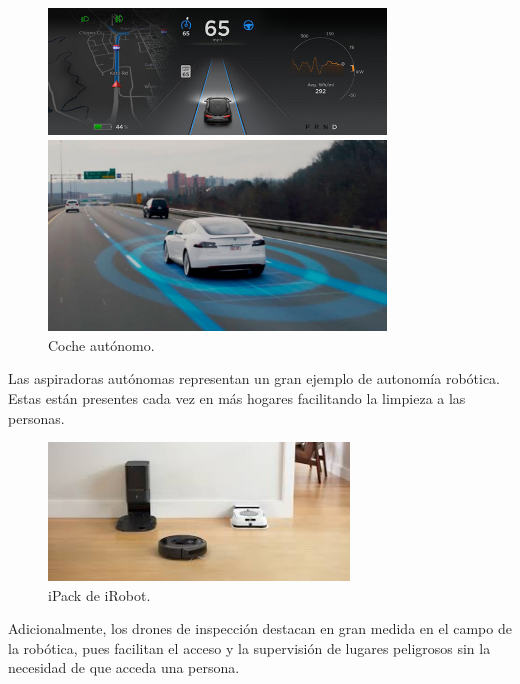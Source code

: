 \documentclass[a4paper, 12pt]{book}
\begin{document}
\begin{figure}[H]
  \centering
  \begin{minipage}[b]{\textwidth}
  	\centering
    \includegraphics[width=0.8\textwidth]{img/coche}
  \end{minipage}
  \hfill
  \begin{minipage}[b]{\textwidth}
    \centering
    \includegraphics[width=0.8\textwidth]{img/tesla.jpg}
  \end{minipage}
  \caption{Coche autónomo.}
\end{figure}

Las aspiradoras autónomas representan un gran ejemplo de autonomía robótica. Estas están presentes cada vez en más hogares facilitando la limpieza a las personas.

\begin{figure}[H]
	\centering
    \includegraphics[width=8cm, keepaspectratio]{img/ipack.jpeg}
    \caption{iPack de iRobot.}
    \label{figura:aspiradora_autonoma}
\end{figure}

Adicionalmente, los drones de inspección destacan en gran medida en el campo de la robótica, pues facilitan el acceso y la supervisión de lugares peligrosos sin la necesidad de que acceda una persona.
\end{document}
